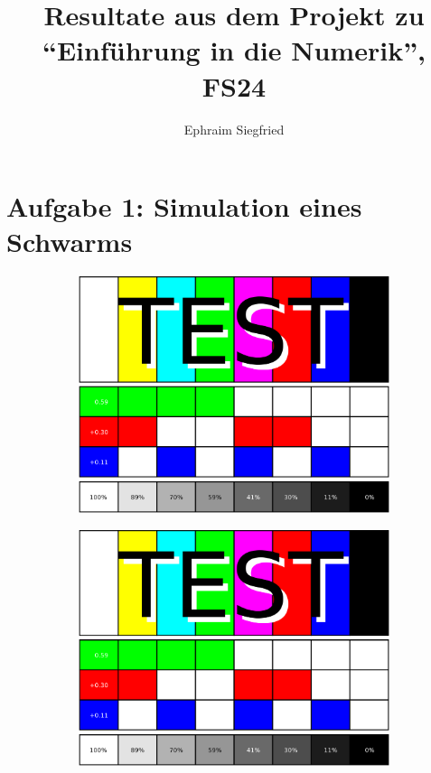\documentclass{article}
\title{Resultate aus dem Projekt zu ``Einf\"uhrung in die Numerik'', FS24}
\author{Ephraim Siegfried}
\begin{document}
\maketitle


\section*{Aufgabe 1: Simulation eines Schwarms}
\begin{figure}[h]
	\begin{subfigure}{0.5\textwidth}
		\centering
		\includegraphics[width=\textwidth]{figures/placeholder.png}
	\end{subfigure}
	\begin{subfigure}{0.5\textwidth}
		\centering
		\includegraphics[width=\textwidth]{figures/placeholder.png}
	\end{subfigure}
	\caption{
		\lipsum[66]
	}
\end{figure}
\end{document}
